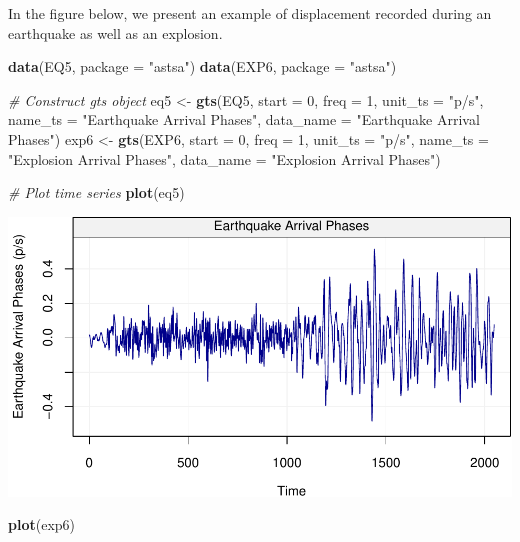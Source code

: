 \documentclass[]{book}
\newenvironment{Shaded}{\begin{snugshade}}{\end{snugshade}}
\newcommand{\KeywordTok}[1]{\textcolor[rgb]{0.13,0.29,0.53}{\textbf{#1}}}
\newcommand{\DataTypeTok}[1]{\textcolor[rgb]{0.13,0.29,0.53}{#1}}
\newcommand{\DecValTok}[1]{\textcolor[rgb]{0.00,0.00,0.81}{#1}}
\newcommand{\StringTok}[1]{\textcolor[rgb]{0.31,0.60,0.02}{#1}}
\newcommand{\CommentTok}[1]{\textcolor[rgb]{0.56,0.35,0.01}{\textit{#1}}}
\newcommand{\NormalTok}[1]{#1}
\theoremstyle{definition}
\theoremstyle{definition}
\theoremstyle{definition}
\theoremstyle{remark}
\let\BeginKnitrBlock\begin \let\EndKnitrBlock\end
\begin{document}
\BeginKnitrBlock{example}
\protect\hypertarget{exm:earthquake}{}{\label{exm:earthquake} }In the figure
below, we present an example of displacement recorded during an
earthquake as well as an explosion.
\EndKnitrBlock{example}

\begin{Shaded}
\begin{Highlighting}[]
\KeywordTok{data}\NormalTok{(EQ5, }\DataTypeTok{package =} \StringTok{"astsa"}\NormalTok{)}
\KeywordTok{data}\NormalTok{(EXP6, }\DataTypeTok{package =} \StringTok{"astsa"}\NormalTok{)}

\CommentTok{# Construct gts object}
\NormalTok{eq5 <-}\StringTok{ }\KeywordTok{gts}\NormalTok{(EQ5, }\DataTypeTok{start =} \DecValTok{0}\NormalTok{, }\DataTypeTok{freq =} \DecValTok{1}\NormalTok{, }\DataTypeTok{unit_ts =} \StringTok{"p/s"}\NormalTok{, }\DataTypeTok{name_ts =} \StringTok{"Earthquake Arrival Phases"}\NormalTok{, }\DataTypeTok{data_name =} \StringTok{"Earthquake Arrival Phases"}\NormalTok{)}
\NormalTok{exp6 <-}\StringTok{ }\KeywordTok{gts}\NormalTok{(EXP6, }\DataTypeTok{start =} \DecValTok{0}\NormalTok{, }\DataTypeTok{freq =} \DecValTok{1}\NormalTok{, }\DataTypeTok{unit_ts =} \StringTok{"p/s"}\NormalTok{, }\DataTypeTok{name_ts =} \StringTok{"Explosion Arrival Phases"}\NormalTok{, }\DataTypeTok{data_name =} \StringTok{"Explosion Arrival Phases"}\NormalTok{)}

\CommentTok{# Plot time series}
\KeywordTok{plot}\NormalTok{(eq5)}
\end{Highlighting}
\end{Shaded}

\begin{center}\includegraphics{ts_files/figure-latex/example_EQ-1} \end{center}

\begin{Shaded}
\begin{Highlighting}[]
\KeywordTok{plot}\NormalTok{(exp6)}
\end{Highlighting}
\end{Shaded}
\end{document}
